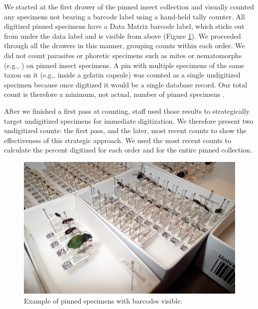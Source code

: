 \begin{multicols}{2}
We started at the first drawer of the pinned insect collection and visually counted any specimens not bearing a  barcode label using a hand-held tally counter. All digitized pinned specimens have a Data Matrix barcode label, which sticks out from under the data label and is visible from above (Figure \ref{barcoded_specimens}). We proceeded through all the drawers in this manner, grouping counts within each order. We did not count parasites or phoretic specimens such as mites or nematomorphs (e.g., ) on pinned insect specimens. A pin with multiple specimens of the same taxon on it (e.g., inside a gelatin capsule) was counted as a single undigitized specimen because once digitized it would be a single database record. Our total count is therefore a minimum, not actual, number of pinned specimens \citep{Sikes2015}. 

After we finished a first pass at counting,  staff used those results to strategically target undigitized specimens for immediate digitization. We therefore present two undigitized counts: the first pass, and the later, most recent counts to show the effectiveness of this strategic approach. We used the most recent counts to calculate the percent digitized for each order and for the entire pinned collection. 

\end{multicols}
\begin{figure}[H]
\begin{center}
\vspace{2mm}
\includegraphics[width=14cm]{img/barcoded_specimens.jpg}
\caption{Example of pinned specimens with  barcodes visible.}
\label{barcoded_specimens}
\end{center}
\end{figure} 
